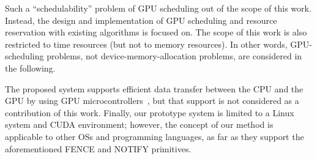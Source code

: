 Such a ``schedulability'' problem of GPU scheduling out of the scope of this work.
Instead, the design and implementation of GPU scheduling and resource reservation with existing algorithms is focused on.
The scope of this work is also restricted to time resources (but not to memory resources).
In other words, GPU-scheduling problems, not device-memory-allocation problems, are considered in the following.

The proposed system supports efficient data transfer between the CPU and the GPU by using GPU microcontrollers~\cite{fujii:icpads2013}, but that support is not considered as a contribution of this work.
Finally, our prototype system is limited to a Linux system and CUDA environment; however, the concept of our method is applicable to other OSs and programming languages, as far as they support the aforementioned FENCE and NOTIFY primitives.
